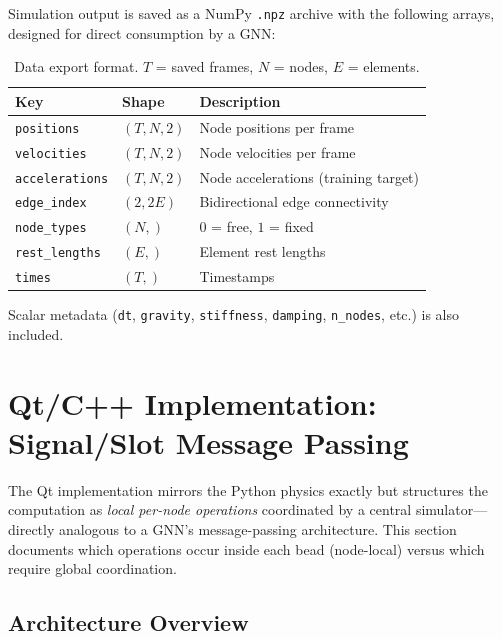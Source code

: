 \documentclass[11pt,a4paper]{article}
\begin{document}
Simulation output is saved as a NumPy \texttt{.npz} archive with the
following arrays, designed for direct consumption by a GNN:

\begin{table}[H]
\centering
\begin{tabular}{lll}
\toprule
Key & Shape & Description \\
\midrule
\texttt{positions}      & $(T, N, 2)$ & Node positions per frame \\
\texttt{velocities}     & $(T, N, 2)$ & Node velocities per frame \\
\texttt{accelerations}  & $(T, N, 2)$ & Node accelerations (training target) \\
\texttt{edge\_index}    & $(2, 2E)$   & Bidirectional edge connectivity \\
\texttt{node\_types}    & $(N,)$      & $0$ = free, $1$ = fixed \\
\texttt{rest\_lengths}  & $(E,)$      & Element rest lengths \\
\texttt{times}          & $(T,)$      & Timestamps \\
\bottomrule
\end{tabular}
\caption{Data export format. $T$ = saved frames, $N$ = nodes, $E$ = elements.}
\label{tab:data}
\end{table}

Scalar metadata (\texttt{dt}, \texttt{gravity}, \texttt{stiffness},
\texttt{damping}, \texttt{n\_nodes}, etc.) is also included.

\section{Qt/C++ Implementation: Signal/Slot Message Passing}
\label{sec:qt}

The Qt implementation mirrors the Python physics exactly but structures the
computation as \emph{local per-node operations} coordinated by a central
simulator---directly analogous to a GNN's message-passing architecture. This
section documents which operations occur inside each bead (node-local) versus
which require global coordination.

\subsection{Architecture Overview}
\end{document}
